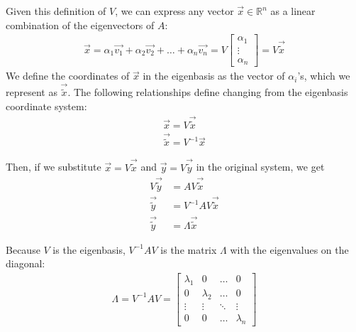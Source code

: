 Given this definition of $V$, we can express any vector $\vec{x} \in \mathbb{R}^n$ as a linear combination of the eigenvectors of $A$:
\begin{align*}
    \vec{x} = \alpha_1 \vec{v_1} + \alpha_2 \vec{v_2} + \dots + \alpha_n \vec{v_n} = V \begin{bmatrix} \alpha_1 \\ \vdots \\ \alpha_n \end{bmatrix} = V \vec{\widetilde{x}}
\end{align*}
We define the coordinates of $\vec{x}$ in the eigenbasis as the vector of $\alpha_i$'s, which we represent as $\vec{\widetilde{x}}$. The following relationships define changing from the eigenbasis coordinate system:
\begin{align*}
    \vec{x} = V \vec{\widetilde{x}} \\
    \vec{\widetilde{x}} = V^{-1} \vec{x}
\end{align*}

Then, if we substitute $\vec{x} = V \vec{\widetilde{x}}$ and $\vec{y} = V \vec{\widetilde{y}}$ in the original system, we get
\begin{align*}
    V \vec{\widetilde{y}} &= AV \vec{\widetilde{x}} \\
    \vec{\widetilde{y}} &= V^{-1}AV \vec{\widetilde{x}} \\
    \vec{\widetilde{y}} &= \Lambda \vec{\widetilde{x}}
\end{align*}

Because $V$ is the eigenbasis, $V^{-1}AV$ is the matrix $\Lambda$ with the eigenvalues on the diagonal:
\begin{align*}
    \boxed{\Lambda = V^{-1}AV} = 
    \begin{bmatrix}
        \lambda_1 & 0 & \dots & 0 \\
        0 & \lambda_2 & \dots & 0 \\
        \vdots & \vdots & \ddots & \vdots \\
        0 & 0 & \dots & \lambda_n
    \end{bmatrix}
\end{align*}

